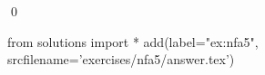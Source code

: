 
\begin{ex} 
  \label{ex:nfa5}
  
  \qed
\end{ex} 
\begin{python0}
from solutions import *
add(label="ex:nfa5",
    srcfilename='exercises/nfa5/answer.tex') 
\end{python0}
